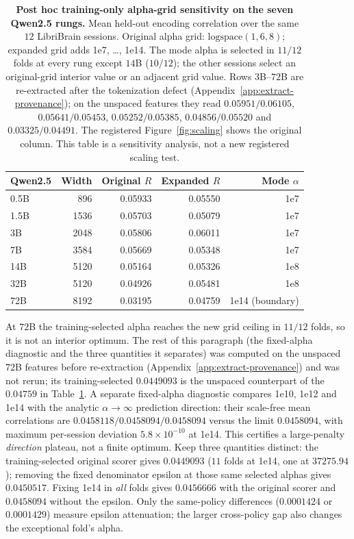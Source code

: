 \documentclass{article}
\begin{document}
\begin{table}[t]
\centering\small
\caption{\textbf{Post hoc training-only alpha-grid sensitivity on the seven Qwen2.5 rungs.}
Mean held-out encoding correlation over the same $12$ LibriBrain sessions. Original alpha grid:
$\mathrm{logspace}(1,6,8)$; expanded grid adds 1e7, \ldots, 1e14.
The mode alpha is selected in $11/12$ folds at every rung except $14$B ($10/12$); the other
sessions select an original-grid interior value or an adjacent grid value. Rows $3$B--$72$B are
re-extracted after the tokenization defect (Appendix~\ref{app:extract-provenance}); on the unspaced
features they read $0.05951/0.06105$, $0.05641/0.05453$, $0.05252/0.05385$, $0.04856/0.05520$ and
$0.03325/0.04491$. The registered Figure~\ref{fig:scaling} shows the original column.
This table is a sensitivity analysis, not a new registered scaling test.}
\label{tab:alpha-grid}
\begin{tabular}{lrrrr}
\toprule
Qwen2.5 & Width & Original $R$ & Expanded $R$ & Mode $\alpha$ \\
\midrule
0.5B & 896  & 0.05933 & 0.05550 & 1e7 \\
1.5B & 1536 & 0.05703 & 0.05079 & 1e7 \\
3B   & 2048 & 0.05806 & 0.06011 & 1e7 \\
7B   & 3584 & 0.05669 & 0.05348 & 1e7 \\
14B  & 5120 & 0.05164 & 0.05326 & 1e8 \\
32B  & 5120 & 0.04926 & 0.05481 & 1e8 \\
72B  & 8192 & 0.03195 & 0.04759 & 1e14 (boundary) \\
\bottomrule
\end{tabular}
\end{table}

At $72$B the training-selected alpha reaches the new grid ceiling in $11/12$ folds, so it
is not an interior optimum. The rest of this paragraph (the fixed-alpha diagnostic and the three quantities it separates) was
computed on the unspaced $72$B features before re-extraction (Appendix~\ref{app:extract-provenance})
and was not rerun; its training-selected $0.0449093$ is the unspaced counterpart of the $0.04759$ in
Table~\ref{tab:alpha-grid}. A separate fixed-alpha diagnostic compares 1e10,
1e12 and 1e14 with the analytic $\alpha\to\infty$ prediction direction:
their scale-free mean correlations are $0.0458118/0.0458094/0.0458094$ versus the
limit $0.0458094$, with maximum per-session deviation $5.8\times10^{-10}$ at 1e14.
This certifies a large-penalty \emph{direction} plateau, not a finite optimum.
Keep three quantities distinct: the training-selected original scorer gives $0.0449093$
($11$ folds at 1e14, one at $37275.94$); removing the fixed denominator epsilon at
those same selected alphas gives $0.0450517$. Fixing 1e14 in \emph{all} folds gives
$0.0456666$ with the original scorer and $0.0458094$ without the epsilon.
Only the same-policy differences ($0.0001424$ or $0.0001429$) measure epsilon attenuation;
the larger cross-policy gap also changes the exceptional fold's alpha.
\end{document}
